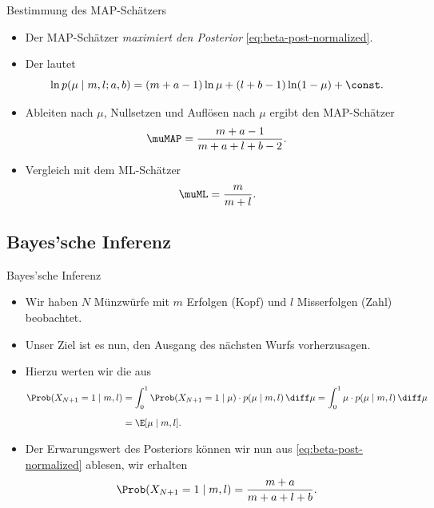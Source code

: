 \begin{frame}{Bestimmung des MAP-Schätzers}{}
	\begin{itemize}
		\item Der MAP-Schätzer \textit{maximiert den Posterior} \eqref{eq:beta-post-normalized}.
		\item Der  lautet
		\begin{equation*}
			\ln p( \mu \mid m, l; a, b) = (m + a - 1) \ln \mu + (l + b - 1) \ln (1 - \mu) + \const.
		\end{equation*}
		\item Ableiten nach $\mu$, Nullsetzen und Auflösen nach $\mu$ ergibt den MAP-Schätzer
		\begin{equation*}
			\muMAP = \frac{m + a - 1}{m + a + l + b - 2}.
		\end{equation*}
		\item Vergleich mit dem ML-Schätzer
		\begin{equation*}
			\muML = \frac{m}{m + l}.
		\end{equation*}
	\end{itemize}
\end{frame}


\subsection{Bayes'sche Inferenz}

\begin{frame}{Bayes'sche Inferenz}{}
	\begin{itemize}
		\item Wir haben $N$ Münzwürfe mit $m$ Erfolgen (Kopf) und $l$ Misserfolgen (Zahl) beobachtet.
		\item Unser Ziel ist es nun, den Ausgang des nächsten Wurfs vorherzusagen.
		\item Hierzu werten wir die  aus
		\begin{align*}
			\Prob(X_{N+1} = 1 \mid m, l)
				&= \int_0^1 \Prob(X_{N+1} = 1 \mid \mu) \cdot p(\mu \mid m, l)\,\diff\mu
					= \int_0^1 \mu \cdot p(\mu \mid m, l)\,\diff\mu
		\\[2mm]
				&= \E[\mu \mid m, l].
		\end{align*}
		\item Der Erwarungswert des Posteriors können wir nun aus \eqref{eq:beta-post-normalized} ablesen, wir erhalten
		\begin{equation*}
			\Prob(X_{N+1} = 1 \mid m, l) = \frac{m + a}{m + a + l + b}.
		\end{equation*}
	\end{itemize}
\end{frame}